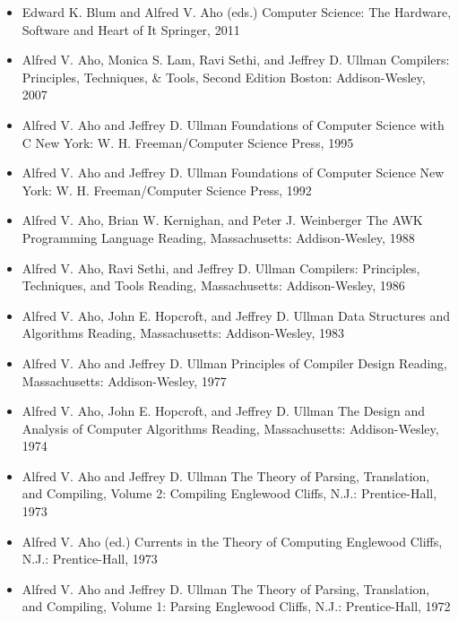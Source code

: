 \documentclass[a4paper]{article}
\begin{document}
\label{sec:knjige}

\begin{itemize}
    \item Edward K. Blum and Alfred V. Aho (eds.)
    Computer Science: The Hardware, Software and Heart of It
    Springer, 2011 
    
    \item Alfred V. Aho, Monica S. Lam, Ravi Sethi, and Jeffrey D. Ullman
    Compilers: Principles, Techniques, \& Tools, Second Edition
    Boston: Addison-Wesley, 2007 
    
    \item Alfred V. Aho and Jeffrey D. Ullman
    Foundations of Computer Science with C
    New York: W. H. Freeman/Computer Science Press, 1995
    
    \item Alfred V. Aho and Jeffrey D. Ullman
    Foundations of Computer Science
    New York: W. H. Freeman/Computer Science Press, 1992 
    
    \item Alfred V. Aho, Brian W. Kernighan, and Peter J. Weinberger
    The AWK Programming Language
    Reading, Massachusetts: Addison-Wesley, 1988 
    
    \item Alfred V. Aho, Ravi Sethi, and Jeffrey D. Ullman
    Compilers: Principles, Techniques, and Tools
    Reading, Massachusetts: Addison-Wesley, 1986

    \item Alfred V. Aho, John E. Hopcroft, and Jeffrey D. Ullman
    Data Structures and Algorithms
    Reading, Massachusetts: Addison-Wesley, 1983

    \item Alfred V. Aho and Jeffrey D. Ullman
    Principles of Compiler Design
    Reading, Massachusetts: Addison-Wesley, 1977
    
    \item Alfred V. Aho, John E. Hopcroft, and Jeffrey D. Ullman
    The Design and Analysis of Computer Algorithms
    Reading, Massachusetts: Addison-Wesley, 1974

    \item Alfred V. Aho and Jeffrey D. Ullman
    The Theory of Parsing, Translation, and Compiling, Volume 2: Compiling
    Englewood Cliffs, N.J.: Prentice-Hall, 1973

    \item Alfred V. Aho (ed.)
    Currents in the Theory of Computing
    Englewood Cliffs, N.J.: Prentice-Hall, 1973

    \item Alfred V. Aho and Jeffrey D. Ullman
    The Theory of Parsing, Translation, and Compiling, Volume 1: Parsing
    Englewood Cliffs, N.J.: Prentice-Hall, 1972



    
\end{itemize}
\end{document}
